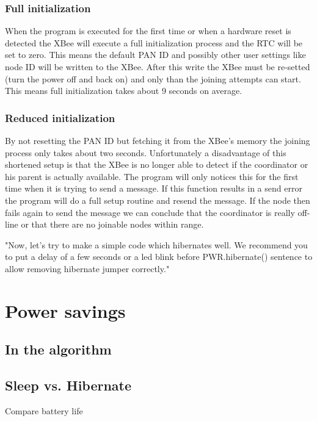 \subsubsection{Full initialization}
When the program is executed for the first time or when a hardware reset is detected the XBee will execute a full initialization process and the RTC will be set to zero. This means the default PAN ID and possibly other user settings like node ID will be written to the XBee. After this write the XBee must be re-setted (turn the power off and back on) and only than the joining attempts can start. This means full initialization takes about 9 seconds on average. 

\subsubsection{Reduced initialization}
By not resetting the PAN ID but fetching it from the XBee's memory the joining process only takes about two seconds. Unfortunately a disadvantage of this shortened setup is that the XBee is no longer able to detect if the coordinator or his parent is actually available. The program will only notices this for the first time when it is trying to send a message. If this function results in a send error the program will do a full setup routine and resend the message. If the node then fails again to send the message we can conclude that the coordinator is really off-line or that there are no joinable nodes within range. 




"Now, let's try to make a simple code which hibernates well. We recommend you to put a delay of a few seconds or a led blink before PWR.hibernate() sentence to allow removing hibernate jumper correctly."

\section{Power savings}
\subsection{In the algorithm}
\subsection{Sleep vs. Hibernate}
Compare battery life
